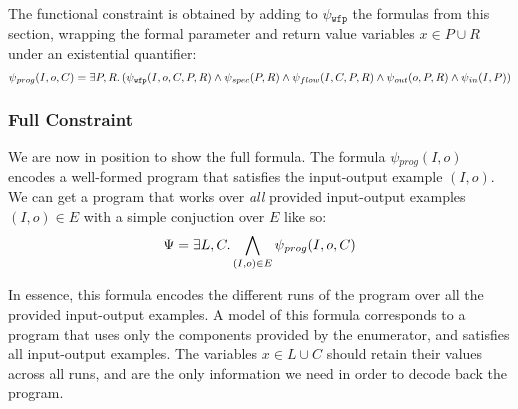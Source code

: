 The functional constraint is obtained by adding to $\psi{}_{\mathtt{wfp}}$ the
formulas from this section, wrapping the formal parameter and return value
variables $x \in P \cup R$ under an existential quantifier:
%
\[
  \psi{}_{prog}(I, o, C) = \exists P,R\ldotp
  (\psi{}_{\mathtt{wfp}}(I, o, C, P, R) \wedge
  \psi{}_{spec}(P, R) \wedge
  \psi{}_{flow}(I, C, P, R) \wedge 
  \psi{}_{out}(o, P, R) \wedge
  \psi{}_{in}(I, P))
\]

\subsubsection{Full Constraint}
\label{sec:full-constraint}

We are now in position to show the full formula. The formula $\psi{}_{prog}(I,
o)$ encodes a well-formed program that satisfies the input-output example $(I,
o)$. We can get a program that works over \textit{all} provided
input-output examples $(I, o) \in E$ with a simple conjuction over $E$ like so:
%
\[
  \Psi{} = \exists L,C\ldotp \bigwedge_{(I, o) \in E}\psi{}_{prog}(I, o, C)
\]

\noindent
In essence, this formula encodes the different runs of the program over all
the provided input-output examples. A model of this formula corresponds to a
program that uses only the components provided by the enumerator, and satisfies
all input-output examples. The variables $x \in L \cup C$ should retain their
values across all runs, and are the only information we need in order to decode
back the program.







